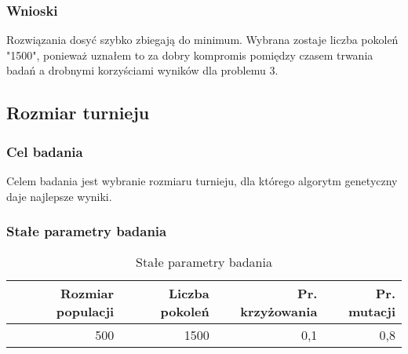 \documentclass[12pt,a4paper]{article}
\begin{document}
\subsubsection{Wnioski}
Rozwiązania dosyć szybko zbiegają do minimum.
Wybrana zostaje liczba pokoleń "1500", ponieważ uznałem to za dobry kompromis pomiędzy czasem trwania badań a drobnymi korzyściami wyników dla problemu 3.

\subsection{Rozmiar turnieju}
\subsubsection{Cel badania}
Celem badania jest wybranie rozmiaru turnieju, dla którego algorytm genetyczny daje najlepsze wyniki.
\subsubsection{Stałe parametry badania}
\begin{table}[htbp]
  \centering
    \begin{tabular}{rrrr}
    \multicolumn{1}{p{8.715em}}{\textbf{Rozmiar populacji}} & \multicolumn{1}{p{7.43em}}{\textbf{Liczba pokoleń}} & \multicolumn{1}{p{9.145em}}{\textbf{Pr. krzyżowania}} & \multicolumn{1}{p{8.355em}}{\textbf{Pr. mutacji}} \\
    \midrule
    500   & 1500  & 0,1   & 0,8 \\
    \end{tabular}%
  \caption{Stałe parametry badania}
  \label{tab:addlabel}%
\end{table}%
\end{document}
